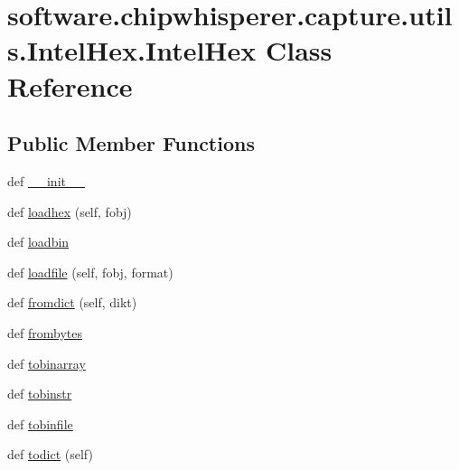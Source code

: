 \hypertarget{classsoftware_1_1chipwhisperer_1_1capture_1_1utils_1_1IntelHex_1_1IntelHex}{}\section{software.\+chipwhisperer.\+capture.\+utils.\+Intel\+Hex.\+Intel\+Hex Class Reference}
\label{classsoftware_1_1chipwhisperer_1_1capture_1_1utils_1_1IntelHex_1_1IntelHex}
\subsection*{Public Member Functions}
\begin{DoxyCompactItemize}
\item 
def \hyperlink{classsoftware_1_1chipwhisperer_1_1capture_1_1utils_1_1IntelHex_1_1IntelHex_abd7fd7245695b21792563d424b09ac27}{\+\_\+\+\_\+init\+\_\+\+\_\+}
\item 
def \hyperlink{classsoftware_1_1chipwhisperer_1_1capture_1_1utils_1_1IntelHex_1_1IntelHex_a775e8d95913df4a5ad79a59e7155f605}{loadhex} (self, fobj)
\item 
def \hyperlink{classsoftware_1_1chipwhisperer_1_1capture_1_1utils_1_1IntelHex_1_1IntelHex_acd9716aa6677362786b1d8655b8707fb}{loadbin}
\item 
def \hyperlink{classsoftware_1_1chipwhisperer_1_1capture_1_1utils_1_1IntelHex_1_1IntelHex_ad59eb04b61c35a525596bbfbef87329f}{loadfile} (self, fobj, format)
\item 
def \hyperlink{classsoftware_1_1chipwhisperer_1_1capture_1_1utils_1_1IntelHex_1_1IntelHex_acaa7238f52227ae07a4aa4e4b1ab0909}{fromdict} (self, dikt)
\item 
def \hyperlink{classsoftware_1_1chipwhisperer_1_1capture_1_1utils_1_1IntelHex_1_1IntelHex_aa262db6dc7ed1909cf4285783abd6d20}{frombytes}
\item 
def \hyperlink{classsoftware_1_1chipwhisperer_1_1capture_1_1utils_1_1IntelHex_1_1IntelHex_a328f8941824c4b535fb8bafbc1dd9add}{tobinarray}
\item 
def \hyperlink{classsoftware_1_1chipwhisperer_1_1capture_1_1utils_1_1IntelHex_1_1IntelHex_a63beaff3fa8ff85530da070327451542}{tobinstr}
\item 
def \hyperlink{classsoftware_1_1chipwhisperer_1_1capture_1_1utils_1_1IntelHex_1_1IntelHex_a1591d7944d6232ffbe20231e5b3547e0}{tobinfile}
\item 
def \hyperlink{classsoftware_1_1chipwhisperer_1_1capture_1_1utils_1_1IntelHex_1_1IntelHex_a7a570a4d3b81de987e2feb5fd1246ed3}{todict} (self)

\end{DoxyCompactItemize}
